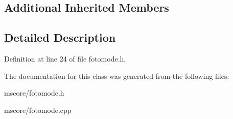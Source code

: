 \subsection*{Additional Inherited Members}


\subsection{Detailed Description}


Definition at line 24 of file fotomode.\+h.



The documentation for this class was generated from the following files\+:\begin{DoxyCompactItemize}
\item 
mscore/fotomode.\+h\item 
mscore/fotomode.\+cpp\end{DoxyCompactItemize}

